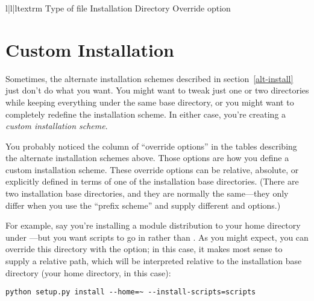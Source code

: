 \documentclass{howto}
\begin{document}
\begin{tableiii}{l|l|l}{textrm}
          {Type of file}
          {Installation Directory}
          {Override option}
             {\filenq{}}
             {}
             {\filenq{}}
             {}
             {}
             {}
             {}
             {}
\end{tableiii}


\section{Custom Installation}
\label{custom-install}

Sometimes, the alternate installation schemes described in
section~\ref{alt-install} just don't do what you want.  You might
want to tweak just one or two directories while keeping everything under
the same base directory, or you might want to completely redefine the
installation scheme.  In either case, you're creating a \emph{custom
installation scheme}.

You probably noticed the column of ``override options'' in the tables
describing the alternate installation schemes above.  Those options are
how you define a custom installation scheme.  These override options can
be relative, absolute, or explicitly defined in terms of one of the
installation base directories.  (There are two installation base
directories, and they are normally the same---they only differ when you
use the \UNIX{} ``prefix scheme'' and supply different
 and  options.)

For example, say you're installing a module distribution to your home
directory under \UNIX---but you want scripts to go in
 rather than .
As you might expect, you can override this directory with the
 option; in this case, it makes most
sense to supply a relative path, which will be interpreted relative to
the installation base directory (your home directory, in this case):

\begin{verbatim}
python setup.py install --home=~ --install-scripts=scripts
\end{verbatim}
\end{document}
